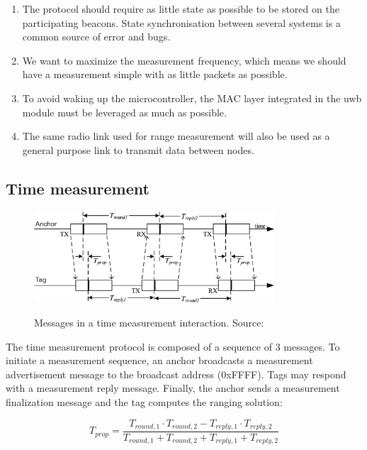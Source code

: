 \documentclass[a4paper, 12pt]{scrreprt}
\begin{document}
\begin{enumerate}
    \item The protocol should require as little state as possible to be stored on the participating beacons.
        State synchronisation between several systems is a common source of error and bugs.
    \item We want to maximize the measurement frequency, which means we should have a measurement simple with as little packets as possible.
    \item To avoid waking up the microcontroller, the MAC layer integrated in the \gls{uwb} module must be leveraged as much as possible.
    \item The same radio link used for range measurement will also be used as a general purpose link to transmit data between nodes.
\end{enumerate}

\subsection{Time measurement}

\begin{figure}[h]
    \centering
    \includegraphics[width=0.8\textwidth]{figures/ranging_protocol.png}
    \label{fig:ranging_protocol}
    \caption[Ranging protocol]{Messages in a time measurement interaction. Source:~\cite{dw1000manual}}
\end{figure}

The time measurement protocol is composed of a sequence of 3 messages.
To initiate a measurement sequence, an anchor broadcasts a measurement advertisement message to the broadcast address (0xFFFF).
Tags may respond with a measurement reply message.
Finally, the anchor sends a measurement finalization message and the tag computes the ranging solution:

\begin{equation}
T_{prop} = \frac{T_{round,1} \cdot T_{round,2} - T_{reply,1} \cdot T_{reply,2}}{T_{round,1} + T_{round,2} + T_{reply,1} + T_{reply,2}}
\label{eqn:ranging}
\end{equation}
\end{document}
